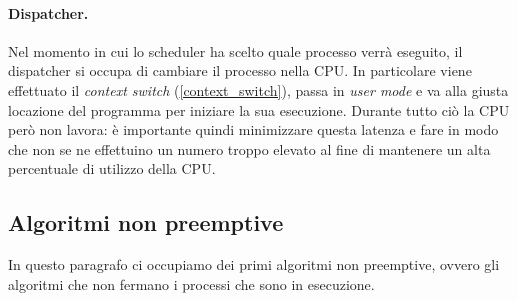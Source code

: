 \paragraph{Dispatcher.}
Nel momento in cui lo scheduler ha scelto quale processo verrà eseguito, il dispatcher si occupa di cambiare il processo nella CPU. In particolare viene effettuato il \textit{context switch} (\ref{context_switch}), passa in \textit{user mode} e va alla giusta locazione del programma per iniziare la sua esecuzione. Durante tutto ciò la CPU però non lavora: è importante quindi minimizzare questa latenza e fare in modo che non se ne effettuino un numero troppo elevato al fine di mantenere un alta percentuale di utilizzo della CPU.
% 
\subsection{Algoritmi non preemptive}
In questo paragrafo ci occupiamo dei primi algoritmi non preemptive, ovvero gli algoritmi che non fermano i processi che sono in esecuzione. 

